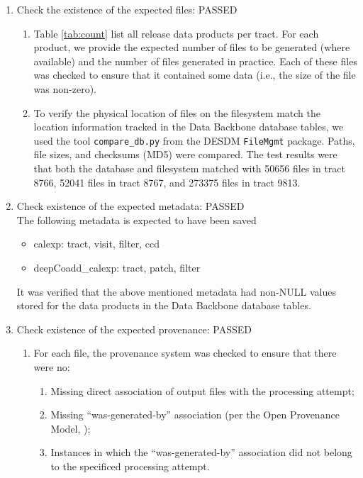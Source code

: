 \documentclass[DM,lsstdraft,STR,toc]{lsstdoc}
\begin{document}
\begin{enumerate}

  \item{Check the existence of the expected files: PASSED}

  \begin{enumerate}

    \item{
      Table \ref{tab:count} list all release data products per tract.
      For each product, we provide the expected number of files to be generated (where available) and the number of files generated in practice.
      Each of these files was checked to ensure that it contained some data (i.e., the size of the file was non-zero).}

    \item{
      To verify the physical location of files on the filesystem match the location information tracked in the Data Backbone database tables, we used the tool
	  \texttt{compare{\_}db.py} from the DESDM \texttt{FileMgmt} package.
      Paths, file sizes, and checksums (MD5) were compared.
      The test results were that both the database and filesystem matched with 50656 files in tract 8766, 52041 files in tract 8767, and 273375 files in tract 9813.
    }
  \end{enumerate}

  \item{
    Check existence of the expected metadata: PASSED\\
    The following metadata is expected to have been saved

    \begin{itemize}
      \item{calexp: tract, visit, filter, ccd}
      \item{deepCoadd\_calexp: tract, patch, filter}
    \end{itemize}

    It was verified that the above mentioned metadata had non-NULL values stored for the data products in the Data Backbone database tables.
  }

  \item{
    Check existence of the expected provenance: PASSED

    \begin{enumerate}
      \item{For each file, the provenance system was checked to ensure that there were no:

        \begin{enumerate}
          \item{Missing direct association of output files with the processing attempt;}
          \item{Missing ``was-generated-by'' association (per the Open Provenance Model, \cite{soton271449});}
          \item{Instances in which the  ``was-generated-by'' association did
          not belong to the specificed processing attempt.}
        \end{enumerate}
      }


\end{enumerate}}
\end{enumerate}
\end{document}

